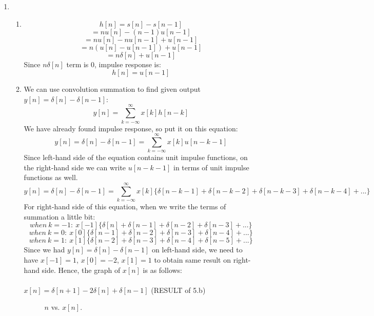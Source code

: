 \documentclass[10pt,a4paper, margin=1in]{article}
\begin{document}
\begin{enumerate}
\item %
    \begin{enumerate}
    \item %
    \[ h[n] = s[n] - s[n-1] \]
    \[ = nu[n] - (n-1)u[n-1] \]
    \[ = nu[n] - nu[n-1] + u[n-1] \]
    \[ = n(u[n]-u[n-1]) + u[n-1] \]
    \[ = n\delta[n] + u[n-1] \]
    Since $n\delta[n]$ term is 0, impulse response is: \\
    \[ h[n] = u[n-1] \]
    \item %
    We can use convolution summation to find given output $y[n] = \delta[n] - \delta[n-1]$:
    \[ y[n] = \sum_{k= -\infty}^{\infty} x[k]h[n-k] \]
    We have already found impulse response, so put it on this equation:
    \[ y[n] = \delta[n] - \delta[n-1] = \sum_{k= -\infty}^{\infty} x[k]u[n-k-1] \]
    Since left-hand side of the equation contains unit impulse functions, on the right-hand side we can write $u[n-k-1]$ in terms of unit impulse functions as well.
    \[ y[n] = \delta[n] - \delta[n-1] = \sum_{k= -\infty}^{\infty} x[k]\{\delta[n-k-1] + \delta[n-k-2] + \delta[n-k-3] + \delta[n-k-4] + ...\} \]
    For right-hand side of this equation, when we write the terms of summation a little bit:
    \[ when \ k=-1: \ x[-1]\{\delta[n] + \delta[n-1] + \delta[n-2] + \delta[n-3] + ...\}   \]
    \[ when \ k=0: \ x[0]\{\delta[n-1] + \delta[n-2] + \delta[n-3] + \delta[n-4] + ...\}   \]
    \[ when \ k=1: \ x[1]\{\delta[n-2] + \delta[n-3] + \delta[n-4] + \delta[n-5] + ...\}   \]
    Since we had $y[n] = \delta[n] - \delta[n-1]$ on left-hand side, we need to have $x[-1] = 1$, $x[0] = -2$, $x[1] = 1$ to obtain same result on right-hand side. Hence, the graph of $x[n]$ is as follows: \\
    \\
$x[n] = \delta[n+1] -2\delta[n] + \delta[n-1]$ (RESULT of 5.b)    
    \begin{figure} [H]
    \centering
    \caption{$n$ vs. $x[n]$.}
    \label{fig:q5_b}
\end{figure} 
    

\end{enumerate}
\end{enumerate}
\end{document}
